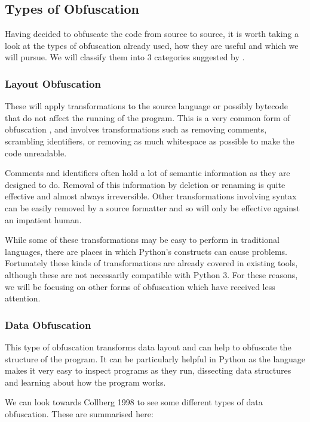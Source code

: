 \documentclass[twoside,a4paper]{report}
\begin{document}
\subsection{Types of Obfuscation}

Having decided to obfuscate the code from source to source, it is worth taking a look at the types of
obfuscation already used, how they are useful and which we will pursue. We will classify them into 3 categories
suggested by \cite[p10]{desevobf}.

\subsubsection{Layout Obfuscation}

These will apply transformations to the source language or possibly bytecode that do not affect the running of the
program. This is a very common form of obfuscation \cite[p10]{desevobf}, and involves transformations such as removing comments,
scrambling identifiers, or removing as much whitespace as possible to make the code unreadable.

Comments and identifiers often hold a lot of semantic information as they are designed to do.
Removal of this information by deletion or renaming is quite effective and almost always irreversible. Other transformations involving syntax
can be easily removed by a source formatter and so will only be effective against an impatient human.

While some of these transformations may be easy to perform in traditional languages, there are places in which
Python's constructs can cause problems. Fortunately these kinds of transformations are already covered in existing
tools, although these are not necessarily compatible with Python 3. For these reasons, we will be focusing on other forms of
obfuscation which have received less attention.

\subsubsection{Data Obfuscation}

This type of obfuscation transforms data layout and can help to obfuscate the structure of the program. It can be
particularly helpful in Python as the language makes it very easy to inspect programs as they run, dissecting data
structures and learning about how the program works.

We can look towards Collberg 1998 \cite{dataobf} to see some different types of data obfuscation. These are summarised here:
\end{document}
